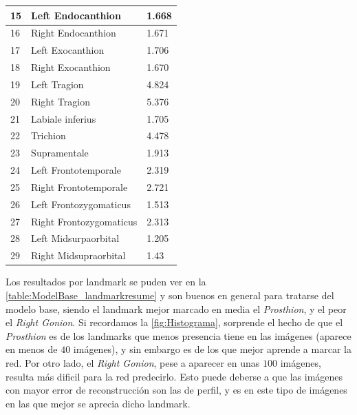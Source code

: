 \begin{table}[!ht]
\begin{tabular}{|l|l|l|}
                15 & Left Endocanthion & 1.668 \\ \hline
                16 & Right Endocanthion & 1.671 \\ \hline
                17 & Left Exocanthion & 1.706 \\ \hline
                18 & Right Exocanthion & 1.670 \\ \hline
                19 & Left Tragion & 4.824 \\ \hline
                20 & Right Tragion & 5.376 \\ \hline
                21 & Labiale inferius & 1.705 \\ \hline
                22 & Trichion & 4.478 \\ \hline
                23 & Supramentale & 1.913 \\ \hline
                24 & Left Frontotemporale & 2.319 \\ \hline
                25 & Right Frontotemporale & 2.721 \\ \hline
                26 & Left Frontozygomaticus & 1.513 \\ \hline
                27 & Right Frontozygomaticus & 2.313 \\ \hline
                28 & Left Midsurpaorbital & 1.205 \\ \hline
                29 & Right Midsupraorbital & 1.43 \\ \hline
            \end{tabular}
            \label{table:ModelBase_landmarkresume}
        \end{table}

        \medskip

        \noindent Los resultados por landmark se puden ver en la \autoref{table:ModelBase_landmarkresume} y son buenos en general para tratarse del modelo base, siendo el landmark mejor marcado en media el \textit{Prosthion}, y el peor el \textit{Right Gonion}. Si recordamos la \autoref{fig:Histograma}, sorprende el hecho de que el \textit{Prosthion} es de los landmarks que menos presencia tiene en las imágenes (aparece en menos de $40$ imágenes), y sin embargo es de los que mejor aprende a marcar la red. Por otro lado, el \textit{Right Gonion}, pese a aparecer en unas $100$ imágenes, resulta más dificil para la red predecirlo. Esto puede deberse a que las imágenes con mayor error de reconstrucción son las de perfil, y es en este tipo de imágenes en las que mejor se aprecia dicho landmark.

        \medskip

